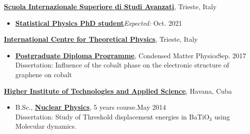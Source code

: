 \documentclass[10pt]{article}
\newenvironment{outerlist}[1][\enskip\textbullet]%
        {\begin{itemize}[#1,leftmargin=*]}{\end{itemize}%
         \vspace{-.6\baselineskip}}
\newenvironment{innerlist}[1][\enskip\textbullet]%
        {\begin{itemize}[#1,leftmargin=*,parsep=0pt,itemsep=0pt,topsep=0pt,partopsep=0pt]}
        {\end{itemize}}
\begin{document}
 \href{https://www.sissa.it/}{\textbf{Scuola Internazionale Superiore di Studi Avanzati}},
Trieste, Italy
\begin{outerlist}
\item[] 
        \href{https://www.statphys.sissa.it/wordpress/?page_id=5801}
             {\textbf{Statistical Physics PhD student}}\hfill{\emph{Expected:} Oct. 2021}
     
\end{outerlist}
\vspace{0.5cm}
 \href{http://www.ictp.it/}{\textbf{International Centre for Theoretical Physics}},
Trieste, Italy
\begin{outerlist}
\item[] 
        \href{http://diploma.ictp.it/}
             {\textbf{Postgraduate Diploma Programme}}, Condensed Matter Physics\hfill{Sep. 2017}\\
             Dissertation: Influence of the cobalt phase on the electronic structure of
graphene on cobalt
     
\end{outerlist}
\vspace{0.5cm}

\href{http://www.instec.cu}{\textbf{Higher Institute of Technologies and Applied Science}},
Havana, Cuba
\begin{outerlist}
\item[] B.Sc.,
        \href{https://www.instec.cu/FCTN/index.php/en/}
             {\textbf{Nuclear Physics}}, 5 years course.\hfill{May 2014}\\
   Dissertation:  Study of Threshold displacement energies in
BaTiO$_3$  using Molecular dynamics. 
 
\end{outerlist}
\end{document}
